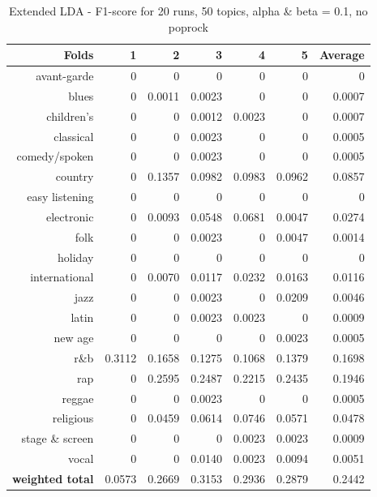 \begin{table}[h]\label{table:extended_nopoprock}
\begin{center}
\begin{tabular}{| r | r | r | r | r | r | r |}
\hline
\textbf{Folds} &  \textbf{1} & \textbf{2} & \textbf{3} & \textbf{4} & \textbf{5} & \textbf{Average}\\
\hline
avant-garde & 0 & 0 & 0 & 0 & 0 & 0\\
blues & 0 & 0.0011 & 0.0023 & 0 & 0 & 0.0007\\
children's & 0 & 0 & 0.0012 & 0.0023 & 0 & 0.0007\\
classical & 0 & 0  & 0.0023 & 0 & 0 & 0.0005\\
comedy/spoken & 0 & 0 & 0.0023 & 0 & 0 & 0.0005 \\
country & 0 & 0.1357 & 0.0982 & 0.0983 & 0.0962 & 0.0857 \\
easy listening & 0 & 0 & 0 & 0 & 0 & 0 \\
electronic & 0 & 0.0093 & 0.0548 & 0.0681 & 0.0047 & 0.0274\\
folk & 0 & 0 & 0.0023 & 0 & 0.0047 & 0.0014\\
holiday & 0 & 0 & 0 & 0 & 0 & 0 \\
international & 0 & 0.0070 & 0.0117 & 0.0232 & 0.0163 & 0.0116\\
jazz & 0 & 0 & 0.0023 & 0 & 0.0209 & 0.0046 \\
latin & 0 & 0 & 0.0023 & 0.0023 & 0 & 0.0009\\
new age & 0 & 0 & 0 & 0 & 0.0023 & 0.0005\\\
r\&b & 0.3112 & 0.1658 & 0.1275 &  0.1068 & 0.1379& 0.1698\\
rap & 0 & 0.2595 & 0.2487 & 0.2215 & 0.2435 & 0.1946\\
reggae & 0 & 0 & 0.0023 & 0 & 0 & 0.0005\\
religious & 0 & 0.0459 & 0.0614 & 0.0746 & 0.0571 & 0.0478\\
stage \& screen & 0 & 0 & 0 & 0.0023 & 0.0023 & 0.0009\\
vocal & 0 & 0 & 0.0140 & 0.0023 & 0.0094 & 0.0051\\
\hline
\textbf{weighted total} &  0.0573 & 0.2669 & 0.3153 & 0.2936 & 0.2879 & 0.2442\\
\hline
\end{tabular}
\end{center}
\caption{Extended LDA - F1-score for 20 runs, 50 topics, alpha \& beta = 0.1, no poprock}
\end{table}

